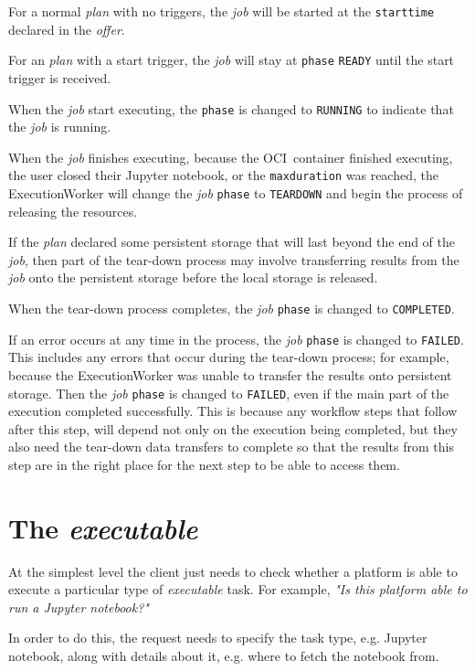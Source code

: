 \documentclass[11pt,a4paper]{ivoa}
\newcommand{\execworkerclass} {ExecutionWorker}
\newcommand{\jupyternotebook} {Jupyter notebook}
\newcommand{\ocicontainer} {OCI~container}
\newcommand{\codeword}[1] {\texttt{#1}}
\newcommand{\executable} {\textit{executable}}
\newcommand{\excutabletask} {\textit{executable} task}
\newcommand{\execplan} {\textit{plan}}
\newcommand{\execoffer} {\textit{offer}}
\newcommand{\workerjob} {\textit{job}}
\newcommand{\teardown} {tear-down}
\begin{document}
For a normal \execplan{} with no triggers, the \workerjob{} will be started at
the \codeword{starttime} declared in the \execoffer{}.

For an \execplan{} with a start trigger, the \workerjob{} will stay at \codeword{phase}
\codeword{READY} until the start trigger is received.

When the \workerjob{} start executing, the \codeword{phase} is changed to \codeword{RUNNING}
to indicate that the \workerjob{} is running.

When the \workerjob{} finishes executing, because the \ocicontainer{} finished executing,
the user closed their \jupyternotebook, or the \codeword{maxduration} was reached,
the \execworkerclass{} will change the \workerjob{} \codeword{phase} to \codeword{TEARDOWN} and
begin the process of releasing the resources.

If the \execplan{} declared some persistent storage that will last beyond the end of the \workerjob{},
then part of the \teardown{} process may involve transferring results from the \workerjob{}
onto the persistent storage before the local storage is released.

When the \teardown{} process completes, the \workerjob{} \codeword{phase} is changed to \codeword{COMPLETED}.

If an error occurs at any time in the process, the \workerjob{} \codeword{phase} is changed to \codeword{FAILED}.
This includes any errors that occur during the \teardown{} process; for example, because
the \execworkerclass{} was unable to transfer the results onto persistent storage.
Then the \workerjob{} \codeword{phase} is changed to \codeword{FAILED}, even if the main part of the
execution completed successfully.
This is because any workflow steps that follow after this step, will depend not only on the execution being
completed, but they also need the \teardown{} data transfers to complete so that the results from this step
are in the right place for the next step to be able to access them.

\section{The \executable{}}
\label{executable}

At the simplest level the client just needs to check whether a platform is able to execute a particular
type of \excutabletask{}.
For example, \textit{"Is this platform able to run a \jupyternotebook{}?"}

In order to do this, the request needs to specify the task type, e.g. \jupyternotebook{},
along with details about it, e.g. where to fetch the notebook from.
\end{document}
